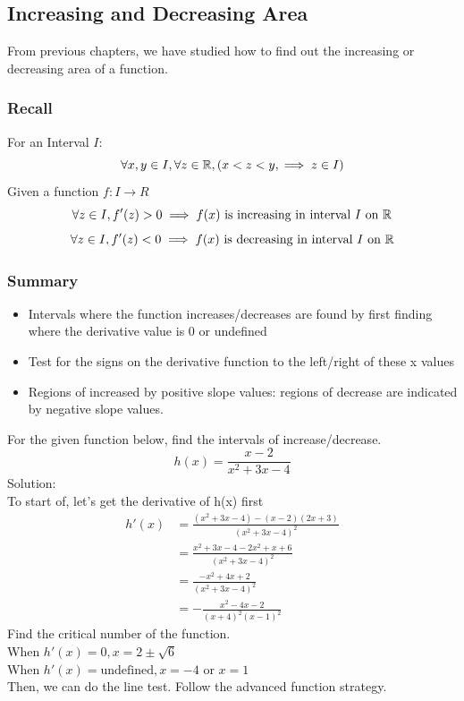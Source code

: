 \subsection{Increasing and Decreasing Area}

From previous chapters, we have studied how to find out the increasing or decreasing area of a function. 

\subsubsection{Recall}
\noindent For an Interval $I$:
$$\forall x, y \in I, \forall z \in \mathbb{R}, (x < z < y, \implies z \in I)$$
Given a function $f: I \to R$
$$\forall z \in I, f'(z) > 0 \implies f(x) \text{ is increasing in interval } I \text{ on }\mathbb{R}$$
$$\forall z \in I, f'(z) < 0 \implies f(x) \text{ is decreasing in interval } I \text{ on }\mathbb{R}$$

\subsubsection{Summary}
\begin{itemize}
    \item Intervals where the function increases/decreases are found by first finding where the derivative value is 0 or undefined
    \item Test for the signs on the derivative function to the left/right of these x values
    \item Regions of increased by positive slope values: regions of decrease are indicated by negative slope values. 
\end{itemize}

\begin{example}
    For the given function below, find the intervals of increase/decrease. 
    $$h(x) = \frac{
        x - 2
    }{
        x^2 + 3x - 4
    }$$
    Solution:\\
    To start of, let's get the derivative of h(x) first
    \begin{align*}
        h'(x) &= \frac{
            (x^2 + 3x - 4) - (x - 2)(2x + 3)
        }{(x^2 + 3x - 4)^2} \\
        &= \frac{x^2 + 3x - 4 - 2x^2 + x + 6}{
            (x^2 + 3x - 4)^2
        }\\
        &= \frac{
            -x^2 + 4x + 2
        }{
            (x^2 + 3x - 4)^2
        } \\
        &= -\frac{x^2 - 4x - 2}{(x + 4)^2 (x - 1)^2}
    \end{align*}
    Find the critical number of the function. \\

    When $h'(x) = 0, x = 2 \pm \sqrt{6}$\\

    When $h'(x) = \text{undefined}, x = -4 \text{ or } x = 1$\\

    \noindent Then, we can do the line test. Follow the advanced function strategy. 
\end{example}